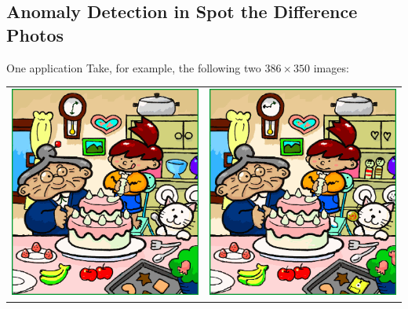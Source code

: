 \subsection{Anomaly Detection in Spot the Difference Photos}
One application
Take, for example, the following two $386\times 350$ images:
\begin{center}
	\begin{tabular}{c c}
		\includegraphics[scale=0.5]{spot_left.png} & \includegraphics[scale=0.5]{spot_right.png} \\
	\end{tabular}
\end{center}
